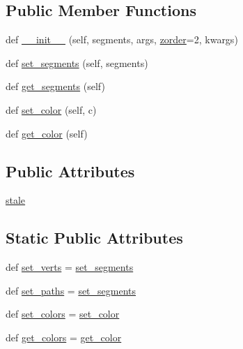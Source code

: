 \subsection*{Public Member Functions}
\begin{DoxyCompactItemize}
\item 
def \hyperlink{classmatplotlib_1_1collections_1_1LineCollection_aa3be8ca273aa64fa046cc23229162431}{\+\_\+\+\_\+init\+\_\+\+\_\+} (self, segments, args, \hyperlink{classmatplotlib_1_1artist_1_1Artist_a210781a1646a5f1e9a1a82bf488c314f}{zorder}=2, kwargs)
\item 
def \hyperlink{classmatplotlib_1_1collections_1_1LineCollection_a0284b1a1f3ff927207affd42fad8f993}{set\+\_\+segments} (self, segments)
\item 
def \hyperlink{classmatplotlib_1_1collections_1_1LineCollection_a5d78cc3f139c90180ce122f90e6e7d8a}{get\+\_\+segments} (self)
\item 
def \hyperlink{classmatplotlib_1_1collections_1_1LineCollection_abafc92b2e40641934d2d28a290d52cdd}{set\+\_\+color} (self, c)
\item 
def \hyperlink{classmatplotlib_1_1collections_1_1LineCollection_a5198841f2dfd098c4212d5923ec8e581}{get\+\_\+color} (self)
\end{DoxyCompactItemize}
\subsection*{Public Attributes}
\begin{DoxyCompactItemize}
\item 
\hyperlink{classmatplotlib_1_1collections_1_1LineCollection_a981a8578c00b63897025b358e2cdd9a1}{stale}
\end{DoxyCompactItemize}
\subsection*{Static Public Attributes}
\begin{DoxyCompactItemize}
\item 
def \hyperlink{classmatplotlib_1_1collections_1_1LineCollection_a8aca91d6d3dc56e4ab276b2e29be2ce2}{set\+\_\+verts} = \hyperlink{classmatplotlib_1_1collections_1_1LineCollection_a0284b1a1f3ff927207affd42fad8f993}{set\+\_\+segments}
\item 
def \hyperlink{classmatplotlib_1_1collections_1_1LineCollection_a6220c2bb5fe4990caafa2367073d4117}{set\+\_\+paths} = \hyperlink{classmatplotlib_1_1collections_1_1LineCollection_a0284b1a1f3ff927207affd42fad8f993}{set\+\_\+segments}
\item 
def \hyperlink{classmatplotlib_1_1collections_1_1LineCollection_a2f7c82fcebe076bd438de240dcfc280e}{set\+\_\+colors} = \hyperlink{classmatplotlib_1_1collections_1_1LineCollection_abafc92b2e40641934d2d28a290d52cdd}{set\+\_\+color}
\item 
def \hyperlink{classmatplotlib_1_1collections_1_1LineCollection_a79a8d7f2fba323cd96cca0bbe513ac29}{get\+\_\+colors} = \hyperlink{classmatplotlib_1_1collections_1_1LineCollection_a5198841f2dfd098c4212d5923ec8e581}{get\+\_\+color}
\end{DoxyCompactItemize}


